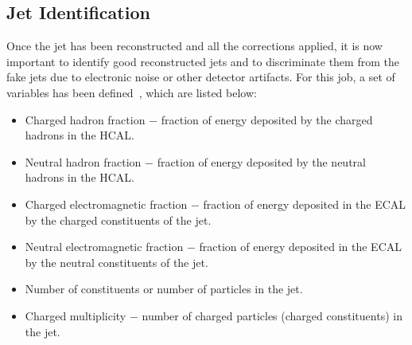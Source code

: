 \subsection{Jet Identification}\label{Se:JetID}
Once the jet has been reconstructed and all the corrections applied, it is now important to identify good reconstructed jets and to discriminate them
 from the fake jets due to electronic noise or other detector artifacts. For this job, a set of variables has been defined~\cite{Web:JetId}, which
 are listed below:
\begin{itemize}
\item Charged hadron fraction $-$ fraction of energy deposited by the charged hadrons in the HCAL.
\item Neutral hadron fraction $-$ fraction of energy deposited by the neutral hadrons in the HCAL.
\item Charged electromagnetic fraction $-$ fraction of energy deposited in the ECAL by the charged constituents of the jet.
\item Neutral electromagnetic fraction $-$ fraction of energy deposited in the ECAL by the neutral constituents of the jet.
\item Number of constituents or number of particles in the jet.
\item Charged multiplicity $-$ number of charged particles (charged constituents) in the jet.


\end{itemize}

